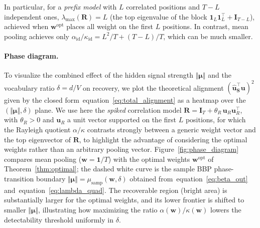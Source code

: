 \documentclass{article}
\def\eqref#1{equation~\ref{#1}}
\def\vone{{\bm{1}}}
\def\vmu{{\bm{\mu}}}
\def\vu{{\bm{u}}}
\def\vw{{\bm{w}}}
\def\mI{{\bm{I}}}
\def\mR{{\bm{R}}}
\def\mS{{\bm{S}}}
\newcommand{\id}{\mathrm{id}}
\newcommand{\opt}{\mathrm{opt}}
\begin{document}
In particular, for a \emph{prefix model} with $L$ correlated positions and $T-L$ independent ones, $\lambda_{\mathrm{max}}(\mR) = L$ (the top eigenvalue of the block $\vone_L\vone_L^\top + \mI_{T-L}$), achieved when $\vw^\opt$ places all weight on the first $L$ positions. In contrast, mean pooling achieves only $\alpha_\id/\kappa_\id = L^2/T + (T-L)/T$, which can be much smaller.

\paragraph{Phase diagram.}
To visualize the combined effect of the hidden signal strength $\Vert \vmu \Vert$ and the vocabulary ratio $\delta = d/V$ on recovery, we plot the theoretical alignment $(\hat\vu_\mS^\top \vu)^2$ given by the closed form~\eqref{eq:total_alignment} as a heatmap over the $(\Vert \vmu \Vert, \delta)$ plane. We use here the \emph{spiked} correlation model $\mR=\mI_T+\theta_R\,\vu_R\vu_R^\top$, with $\theta_R>0$ and $\vu_R$ a unit vector supported on the first $L$ positions, for which the Rayleigh quotient $\alpha/\kappa$ contrasts strongly between a generic weight vector and the top eigenvector of $\mR$, to highlight the advantage of considering the optimal weights rather than an arbitrary pooling vector. Figure~\ref{fig:phase_diagram} compares mean pooling ($\vw=\vone/T$) with the optimal weights $\vw^\opt$ of Theorem~\ref{thm:optimal}; the dashed white curve is the sample BBP phase-transition boundary $\Vert \vmu \Vert = \mu_\mathrm{samp}(\vw,\delta)$ obtained from~\eqref{eq:beta_out} and~\eqref{eq:lambda_quad}. The recoverable region (bright area) is substantially larger for the optimal weights, and its lower frontier is shifted to smaller $\Vert \vmu \Vert$, illustrating how maximizing the ratio $\alpha(\vw)/\kappa(\vw)$ lowers the detectability threshold uniformly in $\delta$.
\end{document}
